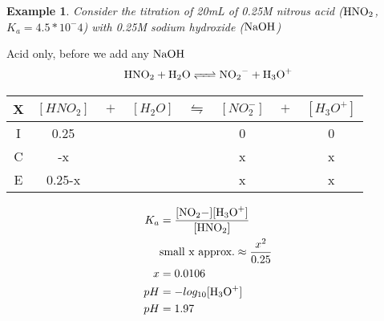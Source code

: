 \documentclass{article}  %
\newtheorem{exmp}{Example}
\begin{document}
\begin{exmp}
    Consider the titration of 20mL of 0.25M nitrous acid ($\ce{HNO2}$, $K_a = 4.5*10^-4$) with 0.25M sodium hydroxide ($\ce{NaOH}$)
\end{exmp}
Acid only, before we add any $\ce{NaOH}$
\begin{equation*}
    \begin{aligned}
        \ce{HNO2 + H2O <=> NO2- + H3O+}
    \end{aligned}
\end{equation*}
\newline
\begin{tabular}{c|c@{}c@{}c@{}c@{}c@{}c@{}c}
    \hline
    X   & $[HNO_2]$ & ${}+{}$ & $[H_2O]$ & ${}\leftrightharpoons{}$ & $[NO_2^-]$ & ${}+{}$ & $[H_3O^+]$ \\
    \hline
    I   &  0.25   &&     &&  0   && 0  \\
    C   &  -x  &&     &&  x  && x \\
    E   & 0.25-x &&     &&  x  && x \\      
\end{tabular}
\newline
\begin{equation*}
    \begin{aligned}
        K_a &= \ce{\frac{[NO2-][H3O+]}{[HNO2]}} \\
            &\text{small x approx.} \approx \frac{x^2}{0.25} \\
          x &= 0.0106 \\
        pH &= -log_{10}\ce{[H3O+]} \\
        pH &= 1.97
    \end{aligned}
\end{equation*}
\end{document}

